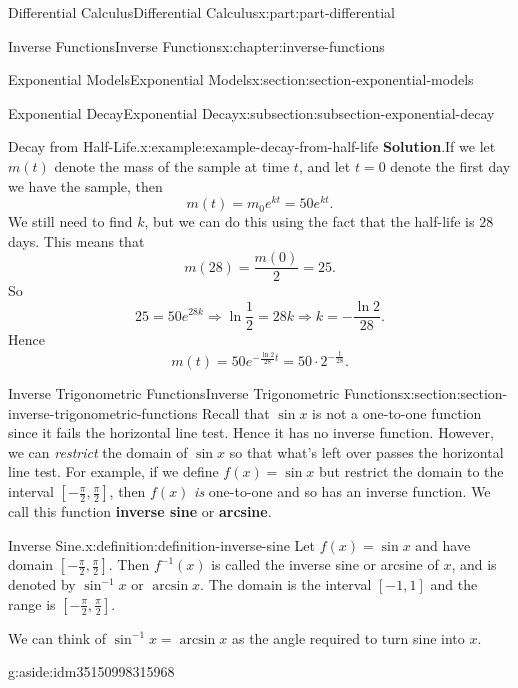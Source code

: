 \documentclass[twoside,10pt,]{tufte-book}
\newcommand{\blocktitlefont}{\relax}
\newcommand{\terminology}[1]{\textbf{#1}}
\numberwithin{equation}{part}
\begin{document}
\begin{partptx}{Differential Calculus}{}{Differential Calculus}{}{}{x:part:part-differential}
\begin{chapterptx}{Inverse Functions}{}{Inverse Functions}{}{}{x:chapter:inverse-functions}
\begin{sectionptx}{Exponential Models}{}{Exponential Models}{}{}{x:section:section-exponential-models}
\begin{subsectionptx}{Exponential Decay}{}{Exponential Decay}{}{}{x:subsection:subsection-exponential-decay}
\begin{example}{Decay from Half-Life.}{x:example:example-decay-from-half-life}
\noindent\textbf{\blocktitlefont Solution}.\hypertarget{g:solution:idm35150998330048}{}\quad{}If we let \(m(t)\) denote the mass of the sample at time \(t\), and let \(t=0\) denote the first day we have the sample, then%
\begin{equation*}
m(t) = m_{0}e^{kt} = 50e^{kt}.
\end{equation*}
We still need to find \(k\), but we can do this using the fact that the half-life is \(28\) days. This means that%
\begin{equation*}
m(28) = \frac{m(0)}{2} = 25.
\end{equation*}
So%
\begin{equation*}
25 = 50e^{28k}\Rightarrow \ln\frac{1}{2} = 28k\Rightarrow k = -\frac{\ln2}{28}.
\end{equation*}
Hence%
\begin{equation*}
m(t) = 50e^{-\frac{\ln2}{28}t} = 50\cdot2^{-\frac{t}{28}}.
\end{equation*}
%
\end{example}
\end{subsectionptx}
\end{sectionptx}
%
%
\typeout{************************************************}
\typeout{************************************************}
%
\begin{sectionptx}{Inverse Trigonometric Functions}{}{Inverse Trigonometric Functions}{}{}{x:section:section-inverse-trigonometric-functions}
Recall that \(\sin x\) is not a one-to-one function since it fails the horizontal line test. Hence it has no inverse function. However, we can \emph{restrict} the domain of \(\sin x\) so that what's left over passes the horizontal line test. For example, if we define \(f(x) = \sin x\) but restrict the domain to the interval \([-\frac{\pi}{2},\frac{\pi}{2}]\), then \(f(x)\) \emph{is} one-to-one and so has an inverse function. We call this function \terminology{inverse sine} or \terminology{arcsine}.%
\begin{definition}{Inverse Sine.}{x:definition:definition-inverse-sine}%
%
Let \(f(x) = \sin x\) and have domain \([-\frac{\pi}{2},\frac{\pi}{2}]\). Then \(f^{-1}(x)\) is called the inverse sine or arcsine of \(x\), and is denoted by \(\sin^{-1}x\) or \(\arcsin x\). The domain is the interval \([-1,1]\) and the range is \([-\frac{\pi}{2},\frac{\pi}{2}]\).%
\end{definition}
We can think of \(\sin^{-1}x = \arcsin x\) as the angle required to turn sine into \(x\). \begin{aside}{}{g:aside:idm35150998315968}%

\end{aside}
\end{sectionptx}
\end{chapterptx}
\end{partptx}
\end{document}
